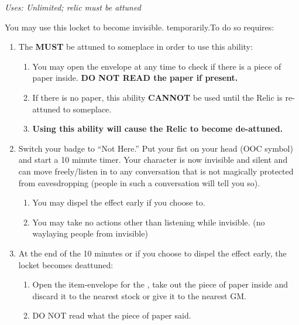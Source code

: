 \documentclass[green]{GL2020}
\begin{document}
\name{\gInvisible{}}

\emph{Uses: Unlimited; relic must be attuned} 

You may use this locket to become invisible. temporarily.To do so requires:

\begin{enumerate}
	\item The \iLocket{} \textbf{MUST} be attuned to someplace in order to use this ability:
	\begin{enumerate}
		\item You may open the envelope at any time to check if there is a piece of paper inside. \textbf{DO NOT READ the paper if present.}
		\item  If there is no paper, this ability \textbf{CANNOT} be used until the Relic is re-attuned to someplace.
		\item \textbf{Using this ability will cause the Relic to become de-attuned.}
	\end{enumerate}
	\item Switch your badge to ``Not Here.'' Put your fist on your head (OOC symbol) and start a 10 minute timer. Your character is now invisible and silent and can move freely/listen in to any conversation that is not magically protected from eavesdropping (people in such a conversation will tell you so).
	\begin{enumerate}
		\item You may dispel the effect early if you choose to.
		\item You may take no actions other than listening while invisible. (no waylaying people from invisible)
	\end{enumerate}
	\item At the end of the 10 minutes or if you choose to dispel the effect early, the locket becomes deattuned:
	\begin{enumerate}
		\item Open the item-envelope for the \iLocket{}, take out the piece of paper inside and discard it to the nearest stock or give it to the nearest GM.
		\item DO NOT read what the piece of paper said.
	\end{enumerate}
\end{enumerate}
\end{document}
